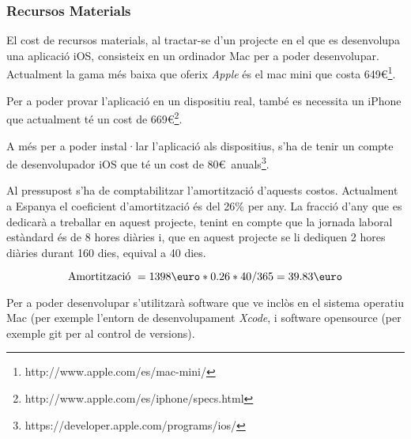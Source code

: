 \subsubsection{Recursos Materials}

El cost de recursos materials, al tractar-se d'un projecte en el que es desenvolupa una aplicació iOS, consisteix en un ordinador Mac per a poder desenvolupar. Actualment la gama més baixa que oferix \textit{Apple} és el mac mini que costa 649\euro\footnote{http://www.apple.com/es/mac-mini/}.

Per a poder provar l'aplicació en un dispositiu real, també es necessita un iPhone que actualment té un cost de 669\euro\footnote{http://www.apple.com/es/iphone/specs.html}.

A més per a poder instal·lar l'aplicació als dispositius, s'ha de tenir un compte de desenvolupador iOS que té un cost de 80\euro~anuals\footnote{https://developer.apple.com/programs/ios/}.

Al pressupost s'ha de comptabilitzar l'amortització d'aquests costos. Actualment a Espanya el coeficient d'amortització és del 26\%\cite{amortitzacio} per any. La fracció d'any que es dedicarà a treballar en aquest projecte, tenint en compte que la jornada laboral estàndard és de 8 hores diàries i, que en aquest projecte se li dediquen 2 hores diàries durant 160 dies, equival a 40 dies.

\begin{equation} 
\mbox{Amortització } = 1398 \textup{\euro} * 0.26 * 40 / 365 = 39.83 \textup{\euro}
\end{equation}

Per a poder desenvolupar s'utilitzarà software que ve inclòs en el sistema operatiu Mac (per exemple l'entorn de desenvolupament \textit{Xcode}, i software opensource (per exemple git per al control de versions).
